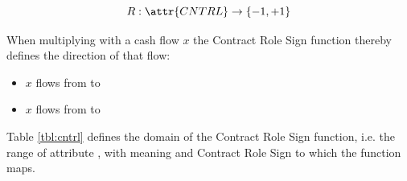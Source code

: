 \[
	R : \attr{CNTRL} \rightarrow \{-1, +1 \}
\]

When multiplying with a cash flow $x$ the Contract Role Sign function thereby defines the direction of that flow:

\begin{itemize}
	\item[$x>0$:] $x$ flows from  to 

	\item[$x<0$:] $x$ flows from  to 
\end{itemize}

Table \ref{tbl:cntrl} defines the domain of the Contract Role Sign function, i.e. the range of attribute , with meaning and Contract Role Sign to which the function maps.


